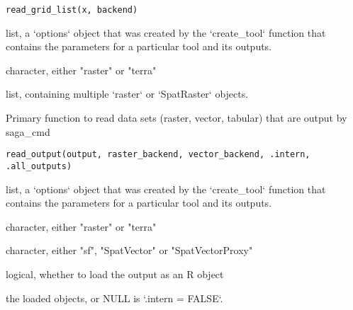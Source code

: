 \documentclass[a4paper]{book}
\begin{document}
%
\begin{Usage}
\begin{verbatim}
read_grid_list(x, backend)
\end{verbatim}
\end{Usage}
%
\begin{Arguments}
\begin{ldescription}
\item[\code{x}] list, a `options` object that was created by the `create\_tool`
function that contains the parameters for a particular tool and its
outputs.

\item[\code{backend}] character, either "raster" or "terra"
\end{ldescription}
\end{Arguments}
%
\begin{Value}
list, containing multiple `raster` or `SpatRaster` objects.
\end{Value}
%
\begin{Description}
Primary function to read data sets (raster, vector, tabular) that are output
by saga\_cmd
\end{Description}
%
\begin{Usage}
\begin{verbatim}
read_output(output, raster_backend, vector_backend, .intern, .all_outputs)
\end{verbatim}
\end{Usage}
%
\begin{Arguments}
\begin{ldescription}
\item[\code{output}] list, a `options` object that was created by the `create\_tool`
function that contains the parameters for a particular tool and its
outputs.

\item[\code{raster\_backend}] character, either "raster" or "terra"

\item[\code{vector\_backend}] character, either "sf", "SpatVector" or
"SpatVectorProxy"

\item[\code{.intern}] logical, whether to load the output as an R object
\end{ldescription}
\end{Arguments}
%
\begin{Value}
the loaded objects, or NULL is `.intern = FALSE`.
\end{Value}
\end{document}
